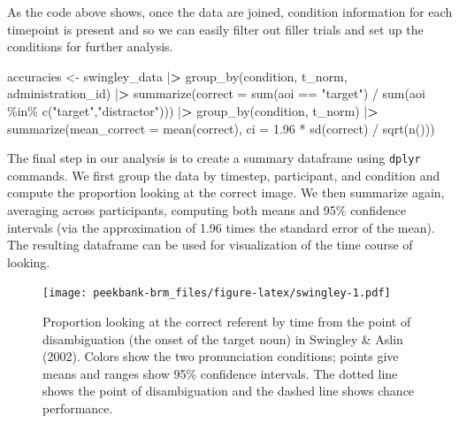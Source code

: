 \documentclass[
  english,
  man,floatsintext]{apa6}
\newenvironment{Shaded}{\begin{snugshade}}{\end{snugshade}}
\newcommand{\AttributeTok}[1]{\textcolor[rgb]{0.77,0.63,0.00}{#1}}
\newcommand{\ErrorTok}[1]{\textcolor[rgb]{0.64,0.00,0.00}{\textbf{#1}}}
\newcommand{\FloatTok}[1]{\textcolor[rgb]{0.00,0.00,0.81}{#1}}
\newcommand{\FunctionTok}[1]{\textcolor[rgb]{0.00,0.00,0.00}{#1}}
\newcommand{\NormalTok}[1]{#1}
\newcommand{\OtherTok}[1]{\textcolor[rgb]{0.56,0.35,0.01}{#1}}
\newcommand{\SpecialCharTok}[1]{\textcolor[rgb]{0.00,0.00,0.00}{#1}}
\newcommand{\StringTok}[1]{\textcolor[rgb]{0.31,0.60,0.02}{#1}}
\begin{document}
\doublespacing

As the code above shows, once the data are joined, condition information for each timepoint is present and so we can easily filter out filler trials and set up the conditions for further analysis.

\singlespacing

\begin{Shaded}
\begin{Highlighting}[]
\NormalTok{accuracies }\OtherTok{\textless{}{-}}\NormalTok{ swingley\_data  }\SpecialCharTok{|}\ErrorTok{\textgreater{}}
  \FunctionTok{group\_by}\NormalTok{(condition, t\_norm, administration\_id) }\SpecialCharTok{|}\ErrorTok{\textgreater{}} 
  \FunctionTok{summarize}\NormalTok{(}\AttributeTok{correct =} \FunctionTok{sum}\NormalTok{(aoi }\SpecialCharTok{==} \StringTok{"target"}\NormalTok{) }\SpecialCharTok{/} 
              \FunctionTok{sum}\NormalTok{(aoi }\SpecialCharTok{\%in\%} \FunctionTok{c}\NormalTok{(}\StringTok{"target"}\NormalTok{,}\StringTok{"distractor"}\NormalTok{))) }\SpecialCharTok{|}\ErrorTok{\textgreater{}}
  \FunctionTok{group\_by}\NormalTok{(condition, t\_norm) }\SpecialCharTok{|}\ErrorTok{\textgreater{}} 
  \FunctionTok{summarize}\NormalTok{(}\AttributeTok{mean\_correct =} \FunctionTok{mean}\NormalTok{(correct),}
            \AttributeTok{ci =} \FloatTok{1.96} \SpecialCharTok{*} \FunctionTok{sd}\NormalTok{(correct) }\SpecialCharTok{/} \FunctionTok{sqrt}\NormalTok{(}\FunctionTok{n}\NormalTok{()))}
\end{Highlighting}
\end{Shaded}

\doublespacing

The final step in our analysis is to create a summary dataframe using \texttt{dplyr} commands. We first group the data by timestep, participant, and condition and compute the proportion looking at the correct image. We then summarize again, averaging across participants, computing both means and 95\% confidence intervals (via the approximation of 1.96 times the standard error of the mean). The resulting dataframe can be used for visualization of the time course of looking.

\begin{figure}
\centering
\texttt{[image: peekbank-brm\_files/figure-latex/swingley-1.pdf]}
\caption{\label{fig:swingley}Proportion looking at the correct referent by time from the point of disambiguation (the onset of the target noun) in Swingley \& Aslin (2002). Colors show the two pronunciation conditions; points give means and ranges show 95\% confidence intervals. The dotted line shows the point of disambiguation and the dashed line shows chance performance.}
\end{figure}
\end{document}
